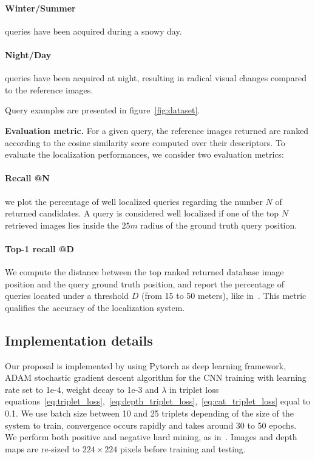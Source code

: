 	\paragraph{Winter/Summer} queries have been acquired during a snowy day.
	\paragraph{Night/Day} queries have been acquired at night, resulting in radical visual changes compared to the reference images.

Query examples are presented in figure~\ref{fig:dataset}.
	
\vspace{4pt}\noindent\textbf{Evaluation metric.} For a given query, the reference images returned are ranked according to the cosine similarity score computed over their descriptors. To evaluate the localization performances, we consider two evaluation metrics:
	\setcounter{paragraph}{0}
	\paragraph{Recall @N} we plot the percentage of well localized queries regarding the number $N$ of returned candidates. A query is considered well localized if one of the top $N$ retrieved images lies inside the $25m$ radius of the ground truth query position.
	\paragraph{Top-1 recall @D} We compute the distance between the top ranked returned database image position and the query ground truth position, and report the percentage of queries located under a threshold $D$ (from 15 to 50 meters), like in~\cite{Zamir2014}. This metric qualifies the accuracy of the localization system.

\subsection{Implementation details}
\label{subsec:implementation}

Our proposal is implemented by using Pytorch as deep learning framework, ADAM stochastic gradient descent algorithm for the CNN training with learning rate set to 1e-4, weight decay to 1e-3 and $\lambda$ in triplet loss equations~\ref{eq:triplet_loss},~\ref{eq:depth_triplet_loss},~\ref{eq:cat_triplet_loss} equal to 0.1. We use batch size between 10 and 25 triplets depending of the size of the system to train, convergence occurs rapidly and takes around 30 to 50 epochs. We perform both positive and negative hard mining, as in~\cite{Radenovic2017}. Images and depth maps are re-sized to $224\times224$ pixels before training and testing.

